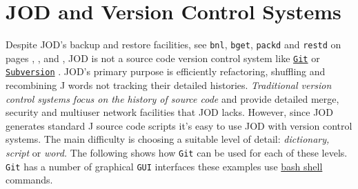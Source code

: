 \section{JOD and Version Control Systems}\label{ap:jodvcsys}

Despite JOD's backup and restore facilities, see \texttt{bnl}, \texttt{bget}, \texttt{packd} and
\texttt{restd} on pages \pageref{ss:bnl}, \pageref{ss:bget}, \pageref{ss:packd} and \pageref{ss:restd}, JOD is not 
a  source code version control system like \href{http://git-scm.com/}{\texttt{Git}} \cite{gitsite} or 
\href{http://subversion.tigris.org/}{\texttt{Subversion}} \cite{subvsite}. 
 JOD's primary
purpose is efficiently  refactoring, shuffling and recombining J words not tracking their detailed histories. 
\emph{Traditional version control systems focus on the history
of source code} and provide detailed  merge, security and multiuser network 
facilities that JOD  lacks.  However, since JOD generates
standard J source code scripts it's easy to use JOD with version control systems. 
The main difficulty is choosing a suitable level of detail: \emph{dictionary, script} or \emph{word.} 
The following shows how \texttt{Git} can be used for each of these levels. \texttt{Git} has
a number of graphical \texttt{GUI} interfaces these examples use 
\href{http://www.gnu.org/software/bash/manual/bashref.html}{bash shell} commands.

